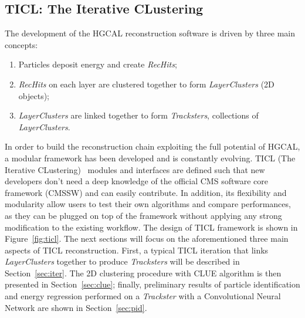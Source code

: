 \subsection{TICL: The Iterative CLustering}
The development of the HGCAL reconstruction software is driven by three main concepts:
\begin{enumerate}
\itemsep0em
    \item Particles deposit energy and create \emph{RecHits};
    \item \emph{RecHits} on each layer are clustered together to form \emph{LayerClusters} (2D objects);
    \item \emph{LayerClusters} are linked together to form \emph{Tracksters}, collections of \emph{LayerClusters}.
\end{enumerate}

In order to build the reconstruction chain exploiting the full potential of HGCAL, a modular framework has been developed and is constantly evolving. TICL (The Iterative CLustering)~\cite{9} modules and interfaces are defined such that new developers don't need a deep knowledge of the official CMS software core framework (CMSSW) and can easily contribute. In addition, its flexibility and modularity allow users to test their own algorithms and compare performances, as they can be plugged on top of the framework without applying any strong modification to the existing workflow. The design of TICL framework is shown in Figure~\ref{fig:ticl}. The next sections will focus on the aforementioned three main aspects of TICL reconstruction. First, a typical TICL iteration that links \emph{LayerClusters} together to produce \emph{Tracksters} will be described in Section~\ref{sec:iter}. The 2D clustering procedure with CLUE algorithm is then presented in Section~\ref{sec:clue}; finally, preliminary results of particle identification and energy regression performed on a \emph{Trackster} with a Convolutional Neural Network are shown in Section~\ref{sec:pid}.

